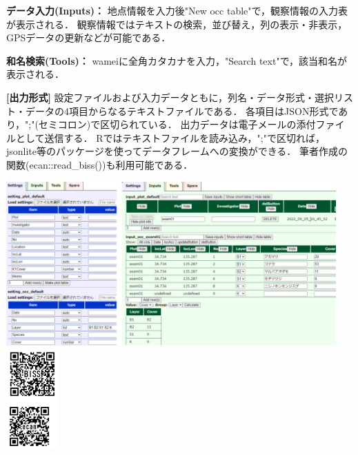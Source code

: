 \documentclass[11pt]{jsarticle}
\begin{document}
\noindent
\textbf{データ入力(Inputs)：}
地点情報を入力後"New occ table"で，観察情報の入力表が表示される．
観察情報ではテキストの検索，並び替え，列の表示・非表示，GPSデータの更新などが可能である．

\noindent
\textbf{和名検索(Tools)：}
wameiに全角カタカナを入力，"Search text"で，該当和名が表示される．

\noindent
\textbf{[出力形式]}
設定ファイルおよび入力データともに，列名・データ形式・選択リスト・データの4項目からなるテキストファイルである．
各項目はJSON形式であり，";"(セミコロン)で区切られている．
出力データは電子メールの添付ファイルとして送信する．
Rではテキストファイルを読み込み，";"で区切れば，jsonlite等のパッケージを使ってデータフレームへの変換ができる．
筆者作成の関数(ecan::read\_biss())も利用可能である．

\vspace{5mm}
\noindent
\includegraphics[height=63mm]{images2.pdf}
\includegraphics[width=20mm]{qr_code.pdf}

\end{document}
